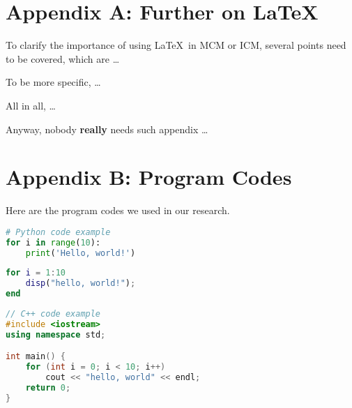 \documentclass[12pt]{article}  %
\begin{document}
\begin{subappendices}  %

\section{Appendix A: Further on \LaTeX}
To clarify the importance of using \LaTeX\ in MCM or ICM, several points need to be covered, which are \ldots

To be more specific, \ldots

All in all, \ldots

Anyway, nobody \textbf{really} needs such appendix \ldots

\section{Appendix B: Program Codes}
Here are the program codes we used in our research.


\begin{lstlisting}[language=Python, name={test.py}]
# Python code example
for i in range(10):
    print('Hello, world!')
\end{lstlisting}

\begin{lstlisting}[language=MATLAB, name={test.m}]
% MATLAB code example
for i = 1:10
    disp("hello, world!");
end
\end{lstlisting}



\begin{lstlisting}[language=C++, name={test.cpp}]
// C++ code example
#include <iostream>
using namespace std;

int main() {
    for (int i = 0; i < 10; i++)
        cout << "hello, world" << endl;
    return 0;
}
\end{lstlisting}

\end{subappendices}  %
\end{document}
